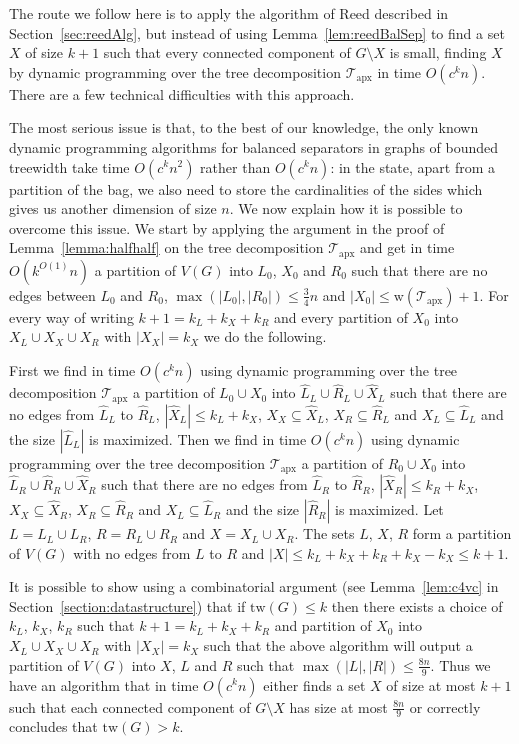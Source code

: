 \documentclass[a4paper,11pt]{article}
\theoremstyle{definition}
\theoremstyle{remark}
\newcommand{\td}{\mathcal{T}} \newcommand{\tw}{\mathrm{tw}} \newcommand{\w}{\mathrm{w}}
\newcommand{\apx}{\textrm{apx}}
\begin{document}
The route we follow here
is to apply the algorithm of Reed described in
Section~\ref{sec:reedAlg}, but instead of using
Lemma~\ref{lem:reedBalSep} to find a set $X$ of size $k+1$ such that
every connected component of $G \setminus X$ is small, finding $X$ by
dynamic programming over the tree decomposition $\td_\apx$ in time
$O(c^kn)$.  There are a few technical difficulties with this approach.

The most serious issue is that, to the best of our knowledge, the only
known dynamic programming algorithms for balanced separators in graphs
of bounded treewidth take time $O(c^kn^2)$ rather than $O(c^kn)$: in
the state, apart from a partition of the bag, we also need to store
the cardinalities of the sides which gives us another dimension of
size $n$.  We now explain how it is possible to overcome this issue.
We start by applying the argument in the proof of
Lemma~\ref{lemma:halfhalf} on the tree decomposition $\td_\apx$ and
get in time $O(k^{O(1)}n)$ a partition of $V(G)$ into $L_0$, $X_0$ and
$R_0$ such that there are no edges between $L_0$ and $R_0$,
$\max(|L_0|, |R_0|) \leq \frac{3}{4}n$ and $|X_0| \leq
\w(\td_\apx)+1$.  For every way of writing $k+1 = k_L + k_X + k_R$ and
every partition of $X_0$ into $X_L \cup X_X \cup X_R$ with $|X_X| =
k_X$ we do the following.

First we find in time $O(c^kn)$ using dynamic programming over the
tree decomposition $\td_\apx$ a partition of $L_0 \cup X_0$ into
$\hat{L}_L \cup \hat{R}_L \cup \hat{X}_L$ such that there are no edges
from $\hat{L}_L$ to $\hat{R}_L$, $|\hat{X}_L| \leq k_L + k_X$, $X_X
\subseteq \hat{X}_L$, $X_R \subseteq \hat{R}_L$ and $X_L \subseteq
\hat{L}_L$ and the size $|\hat{L}_L|$ is maximized.  Then we find in
time $O(c^kn)$ using dynamic programming over the tree decomposition
$\td_\apx$ a partition of $R_0 \cup X_0$ into $\hat{L}_R \cup \hat{R}_R
\cup \hat{X}_R$ such that there are no edges from $\hat{L}_R$ to
$\hat{R}_R$, $|\hat{X}_R| \leq k_R + k_X$, $X_X \subseteq \hat{X}_R$,
$X_R \subseteq \hat{R}_R$ and $X_L \subseteq \hat{L}_R$ and the size
$|\hat{R}_R|$ is maximized.  Let $L = L_L \cup L_R$, $R = R_L \cup
R_R$ and $X = X_L \cup X_R$.  The sets $L$, $X$, $R$ form a partition
of $V(G)$ with no edges from $L$ to $R$ and $|X| \leq k_L + k_X + k_R
+ k_X - k_X \leq k+1$.

It is possible to show using a combinatorial argument (see
Lemma~\ref{lem:c4vc} in Section~\ref{section:datastructure}) that if
$\tw(G) \leq k$ then there exists a choice of $k_L$, $k_X$, $k_R$ such
that $k+1 = k_L + k_X + k_R$ and partition of $X_0$ into $X_L \cup X_X
\cup X_R$ with $|X_X| = k_X$ such that the above algorithm will output
a partition of $V(G)$ into $X$, $L$ and $R$ such that $\max(|L|,|R|)
\leq \frac{8n}{9}$.  Thus we have an algorithm that in time $O(c^kn)$
either finds a set $X$ of size at most $k+1$ such that each connected
component of $G\setminus X$ has size at most $\frac{8n}{9}$ or
correctly concludes that $\tw(G) > k$.
\end{document}
